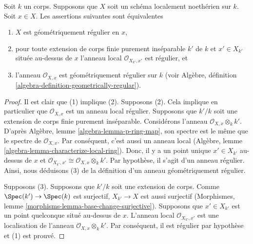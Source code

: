 \begin{lemma}
\label{lemma-geometrically-regular-at-point}
Soit $k$ un corps.
Supposons que $X$ soit un schéma
localement noethérien sur $k$. Soit $x \in
X$. Les assertions suivantes sont équivalentes
\begin{enumerate}
\item $X$ est géométriquement régulier en $x$, \item
pour toute extension de corps finie purement
inséparable $k'$ de $k$ et $x' \in X_{k'}$ située
au-dessus de $x$ l'anneau local $\mathcal{O}_{X_{k'},
x'}$ est régulier, et \item l'anneau $\mathcal{O}_{X,
x}$ est géométriquement régulier sur $k$ (voir Algèbre,
définition \ref{algebra-definition-geometrically-regular}).
\end{enumerate}
\end{lemma}

\begin{proof}
Il est clair que (1) implique (2). Supposons (2). Cela implique
en particulier que $\mathcal{O}_{X, x}$ est un anneau local
régulier. Supposons que $k'/k$ soit une extension de corps finie
purement inséparable. Considérons l'anneau $\mathcal{O}_{X, x}
\otimes_k k'$. D'après Algèbre, lemme
\ref{algebra-lemma-p-ring-map}, son spectre est le même que le
spectre de $\mathcal{O}_{X, x}$. Par conséquent, c'est aussi un
anneau local (Algèbre, lemme
\ref{algebra-lemma-characterize-local-ring}). Donc, il y a un point unique $x'
\in X_{k'}$ au-dessus de $x$ et $\mathcal{O}_{X_{k'}, x'} \cong
\mathcal{O}_{X, x} \otimes_k k'$. Par hypothèse, il s'agit d'un anneau régulier.
Ainsi, nous déduisons (3) de la définition d'un anneau géométriquement régulier.

\medskip\noindent
Supposons (3). Supposons que $k'/k$ soit une extension de
corps. Comme $\Spec(k') \to \Spec(k)$ est surjectif,
$X_{k'} \to X$ est aussi surjectif (Morphismes, lemme
\ref{morphisms-lemma-base-change-surjective}). Supposons que
$x' \in X_{k'}$ est un point quelconque situé au-dessus de
$x$. L'anneau local $\mathcal{O}_{X_{k'}, x'}$ est une
localisation de l'anneau $\mathcal{O}_{X, x} \otimes_k k'$.
Par conséquent, il est régulier par hypothèse et (1) est prouvé.
\end{proof}

